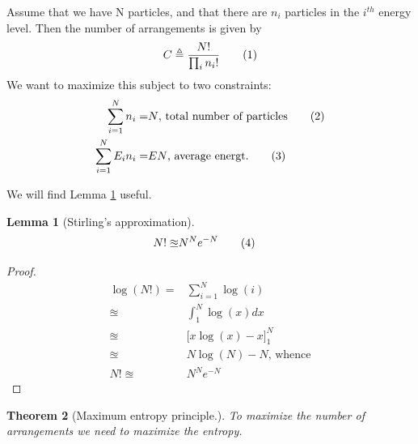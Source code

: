 \documentclass[]{article}
\newcommand\numberthis{\addtocounter{equation}{1}\tag{\theequation}}
\newtheorem{thm}{Theorem}
\newtheorem{lemma}[thm]{Lemma}
\begin{document}
Assume that we have N particles, and that there are $n_i$ particles in the $i^{th}$ energy level. Then the number of arrangements is given by
\begin{align*}
C\triangleq\frac{N!}{\prod_{i}n_i!} \numberthis \label{eq:number:combinations}
\end{align*}
 We want to maximize this subject to two constraints:
\begin{align*}
\sum_{i=1}^{N} n_i =& N \text{, total number of particles} \numberthis\label{eq:sum:probilities}\\
\sum_{i=1}^{N} E_i n_i =& E N \text{, average energt.}\numberthis\label{eq:total:energy}
\end{align*}

We will find Lemma \ref{lemma:Stirling} useful.
\begin{lemma}[Stirling's approximation]\label{lemma:Stirling}
	\begin{align*}
	N! \approxeq& N^N e^{-N}\numberthis\label{eq:stirling}
	\end{align*}
\end{lemma}

\begin{proof}
	\begin{align*}
	\log(N!) =& \sum_{i=1}^{N}\log (i)\\
	\approxeq &\int_{1}^{N} \log(x) dx\\
	\approxeq& \big[x \log(x) - x \big]_1^N\\
	\approxeq& N\log(N)-N\text{, whence} \\
	N! \approxeq& N^N e^{-N}
	\end{align*}
\end{proof}	

\begin{thm}[Maximum entropy principle.]
	To maximize the number of arrangements we need to maximize the entropy.
\end{thm}
\end{document}
